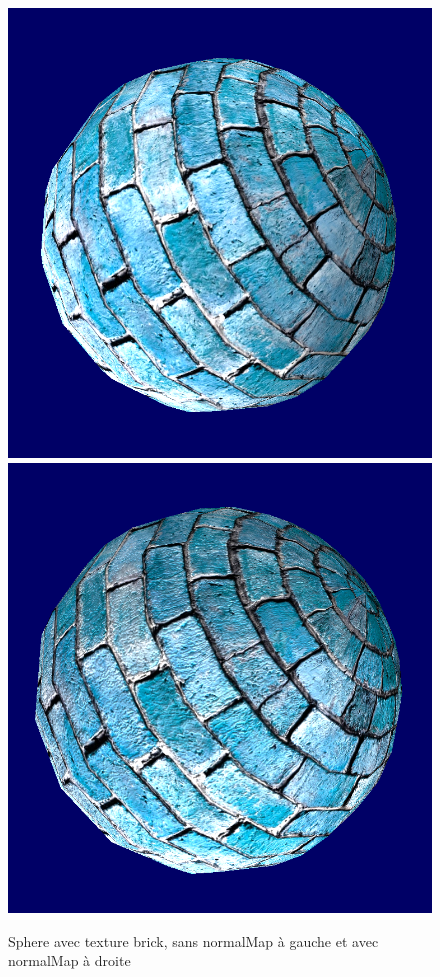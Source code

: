 \documentclass{article}
\begin{document}
\begin{figure}[h]
    \center
    \includegraphics[scale=0.3]{sphereTexture.png}
    \includegraphics[scale=0.3]{sphereTextureNormalMap.png}
    \caption{Sphere avec texture brick, sans normalMap à gauche et avec normalMap à droite}
\end{figure}
\end{document}

